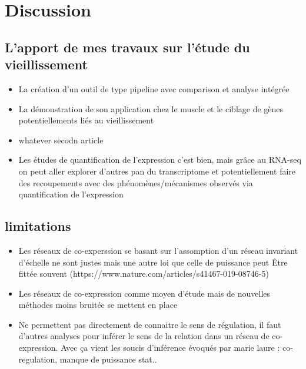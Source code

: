 \setcounter{chapter}{5}
\setcounter{section}{0}
\setcounter{figure}{0}   
\chapter*{Discussion}         %

\section{L'apport de mes travaux sur l'étude du vieillissement}

\begin{itemize}
    \item La création d'un outil de type pipeline avec comparison et analyse intégrée
    \item La démonstration de son application chez le muscle et le ciblage de gènes potentiellements liés au vieillissement
    \item whatever secodn article
    \item Les études de quantification de l'expression c'est bien, mais grâce au RNA-seq on peut aller explorer d'autres pan du transcriptome et potentiellement faire des recoupements avec des phénomènes/mécanismes observés via quantification de l'expression
\end{itemize}

\section{limitations}
\begin{itemize}
    \item Les réseaux de co-experssion se basant sur l'assomption d'un réseau invariant d'échelle ne sont justes mais une autre loi que celle de puissance peut Être fittée souvent (https://www.nature.com/articles/s41467-019-08746-5)
    \item Les réseaux de co-expression comme moyen d'étude mais de nouvelles méthodes moins bruitée se mettent en place %
    \item Ne permettent pas directement de connaitre le sens de régulation, il faut d'autres analyses pour inférer le sens de la relation dans un réseau de co-expression. Avec ça vient les soucis d'inférence évoqués par marie laure : co-regulation, manque de puissance stat..
\end{itemize}



